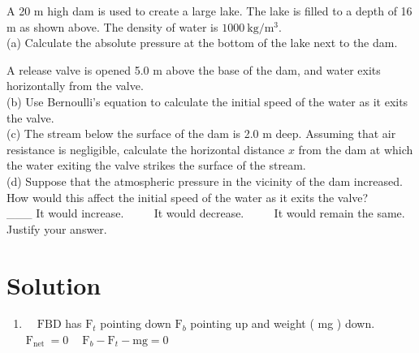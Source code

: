 \begin{enumerate}
A 20 m high dam is used to create a large lake. The lake is filled to a depth of 16 m as shown above. The density of water is $1000 \mathrm{~kg} / \mathrm{m}^{3}$.\\
(a) Calculate the absolute pressure at the bottom of the lake next to the dam.

A release valve is opened 5.0 m above the base of the dam, and water exits horizontally from the valve.\\
(b) Use Bernoulli's equation to calculate the initial speed of the water as it exits the valve.\\
(c) The stream below the surface of the dam is 2.0 m deep. Assuming that air resistance is negligible, calculate the horizontal distance $x$ from the dam at which the water exiting the valve strikes the surface of the stream.\\
(d) Suppose that the atmospheric pressure in the vicinity of the dam increased. How would this affect the initial speed of the water as it exits the valve?\\
\_\_\_ It would increase. $\qquad$ It would decrease. $\qquad$ It would remain the same.\\
Justify your answer.

\section*{Solution}
\begin{enumerate}
  \item $\quad \mathrm{FBD}$ has $\mathrm{F}_{t}$ pointing down $\mathrm{F}_{b}$ pointing up and weight ( mg ) down. $\mathrm{F}_{\text {net }}=0 \quad \mathrm{~F}_{b}-\mathrm{F}_{t}-\mathrm{mg}=0$
\end{enumerate}


\end{enumerate}
